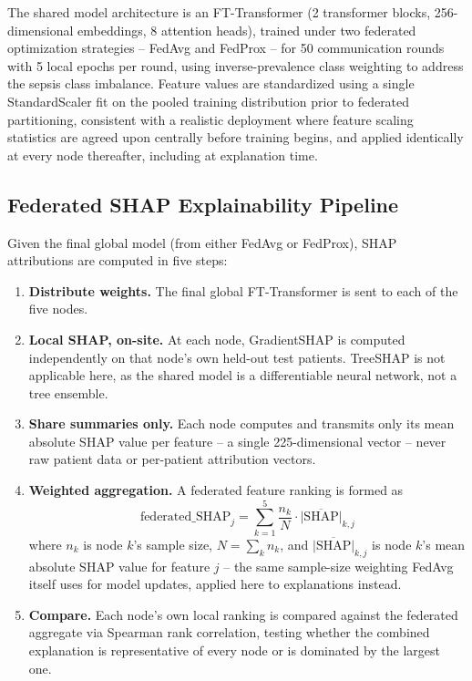 \documentclass[conference]{IEEEtran}
\begin{document}
The shared model architecture is an FT-Transformer
\cite{gorishniy2021revisiting} (2 transformer blocks, 256-dimensional
embeddings, 8 attention heads), trained under two federated optimization
strategies -- FedAvg \cite{mcmahan2017fedavg} and FedProx
\cite{li2020fedprox} -- for 50 communication rounds with 5 local epochs per
round, using inverse-prevalence class weighting to address the sepsis class
imbalance. Feature values are standardized using a single StandardScaler
fit on the pooled training distribution prior to federated partitioning,
consistent with a realistic deployment where feature scaling statistics are
agreed upon centrally before training begins, and applied identically at
every node thereafter, including at explanation time.

\subsection{Federated SHAP Explainability Pipeline}
Given the final global model (from either FedAvg or FedProx), SHAP
attributions are computed in five steps:

\begin{enumerate}
\item \textbf{Distribute weights.} The final global FT-Transformer is sent
to each of the five nodes.
\item \textbf{Local SHAP, on-site.} At each node, GradientSHAP is computed
independently on that node's own held-out test patients. TreeSHAP is not
applicable here, as the shared model is a differentiable neural network,
not a tree ensemble.
\item \textbf{Share summaries only.} Each node computes and transmits only
its mean absolute SHAP value per feature -- a single 225-dimensional
vector -- never raw patient data or per-patient attribution vectors.
\item \textbf{Weighted aggregation.} A federated feature ranking is formed
as
\begin{equation}
\text{federated\_SHAP}_j = \sum_{k=1}^{5} \frac{n_k}{N} \cdot
\overline{|\text{SHAP}|}_{k,j}
\label{eq:agg}
\end{equation}
where $n_k$ is node $k$'s sample size, $N = \sum_k n_k$, and
$\overline{|\text{SHAP}|}_{k,j}$ is node $k$'s mean absolute SHAP value for
feature $j$ -- the same sample-size weighting FedAvg itself uses for model
updates, applied here to explanations instead.
\item \textbf{Compare.} Each node's own local ranking is compared against
the federated aggregate via Spearman rank correlation, testing whether the
combined explanation is representative of every node or is dominated by the
largest one.
\end{enumerate}
\end{document}
